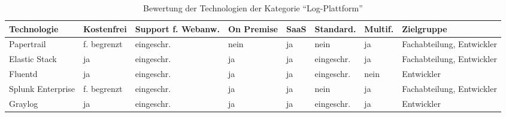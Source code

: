 \begin{table}[H]%
\centering
\addtolength{\leftskip}{-2cm}
\addtolength{\rightskip}{-2cm}
\begin{tabular}{|p{3.05cm}|p{1.8cm}|p{1.7cm}|p{1.2cm}|p{1.3cm}|p{1.7cm}|p{1.3cm}|p{2.6cm}|}
\hline
Technologie & Kostenfrei & Support f. Webanw. & On \mbox{Premise} & SaaS & Standard. & Multif. & Zielgruppe \\
\hline
Papertrail & f. begrenzt & eingeschr. & nein & ja & nein & ja & Fachabteilung, Entwickler \\
\hline
Elastic Stack & ja & eingeschr. & ja & ja & eingeschr. & ja & Fachabteilung, Entwickler \\
\hline
Fluentd & ja & eingeschr. & ja & ja & eingeschr. & nein & Entwickler \\
\hline
Splunk \mbox{Enterprise} & f. begrenzt & eingeschr. & ja & ja & nein & ja & Fachabteilung, Entwickler \\
\hline
Graylog & ja & eingeschr. & ja & ja & eingeschr. & ja & Entwickler \\
\hline
\end{tabular}
\caption{Bewertung der Technologien der Kategorie \enquote{Log-Plattform}}
\label{tab:technologie-bewertung-log-plattform}
\end{table}
